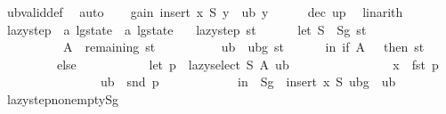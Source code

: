 \begin{isabellebody}
\ ub{\isacharunderscore}{\kern0pt}valid{\isacharunderscore}{\kern0pt}def\ \isamarkupfalse%
\ auto\isanewline
\isanewline
\ \ \isamarkupfalse%
\ {\isachardoublequoteopen}gain\ {\isacharparenleft}{\kern0pt}insert\ x\ S{\isacharparenright}{\kern0pt}\ y\ {\isasymle}\ ub\ y{\isachardoublequoteclose}\isanewline
\ \ \ \ \isamarkupfalse%
\ dec\ up\ \isamarkupfalse%
\ linarith\isanewline
{}\isamarkupfalse%
%
\endisatagproof
{\isafoldproof}%
%
\isadelimproof
%
\endisadelimproof
%
\isadelimdocument
%
\endisadelimdocument
%
\isatagdocument
%
\isamarkuptrue%
%
\endisatagdocument
{\isafolddocument}%
%
\isadelimdocument
%
\endisadelimdocument
{}\isamarkupfalse%
\ lazy{\isacharunderscore}{\kern0pt}step\ {\isacharcolon}{\kern0pt}{\isacharcolon}{\kern0pt}\ {\isachardoublequoteopen}{\isacharprime}{\kern0pt}a\ lg{\isacharunderscore}{\kern0pt}state\ {\isasymRightarrow}\ {\isacharprime}{\kern0pt}a\ lg{\isacharunderscore}{\kern0pt}state{\isachardoublequoteclose}\ \isanewline
\ \ {\isachardoublequoteopen}lazy{\isacharunderscore}{\kern0pt}step\ st\ {\isacharequal}{\kern0pt}\isanewline
\ \ \ \ \ {\isacharparenleft}{\kern0pt}let\ S\ {\isacharequal}{\kern0pt}\ Sg\ st{\isacharsemicolon}{\kern0pt}\isanewline
\ \ \ \ \ \ \ \ \ \ A\ {\isacharequal}{\kern0pt}\ remaining\ st{\isacharsemicolon}{\kern0pt}\isanewline
\ \ \ \ \ \ \ \ \ \ ub\ {\isacharequal}{\kern0pt}\ ubg\ st\isanewline
\ \ \ \ \ \ in\ if\ A\ {\isacharequal}{\kern0pt}\ {\isacharbraceleft}{\kern0pt}{\isacharbraceright}{\kern0pt}\ then\ st\isanewline
\ \ \ \ \ \ \ \ \ else\isanewline
\ \ \ \ \ \ \ \ \ \ \ {\isacharparenleft}{\kern0pt}let\ p\ {\isacharequal}{\kern0pt}\ lazy{\isacharunderscore}{\kern0pt}select\ S\ A\ ub{\isacharsemicolon}{\kern0pt}\isanewline
\ \ \ \ \ \ \ \ \ \ \ \ \ \ \ \ x\ {\isacharequal}{\kern0pt}\ fst\ p{\isacharsemicolon}{\kern0pt}\isanewline
\ \ \ \ \ \ \ \ \ \ \ \ \ \ \ \ ub{\isacharprime}{\kern0pt}\ {\isacharequal}{\kern0pt}\ snd\ p\isanewline
\ \ \ \ \ \ \ \ \ \ \ \ in\ {\isasymlparr}\ Sg\ {\isacharequal}{\kern0pt}\ insert\ x\ S{\isacharcomma}{\kern0pt}\ ubg\ {\isacharequal}{\kern0pt}\ ub{\isacharprime}{\kern0pt}\ {\isasymrparr}{\isacharparenright}{\kern0pt}{\isacharparenright}{\kern0pt}{\isachardoublequoteclose}\isanewline
\isanewline
{}\isamarkupfalse%
\ lazy{\isacharunderscore}{\kern0pt}step{\isacharunderscore}{\kern0pt}nonempty{\isacharunderscore}{\kern0pt}Sg{\isacharcolon}{\kern0pt}\isanewline

\end{isabellebody}
